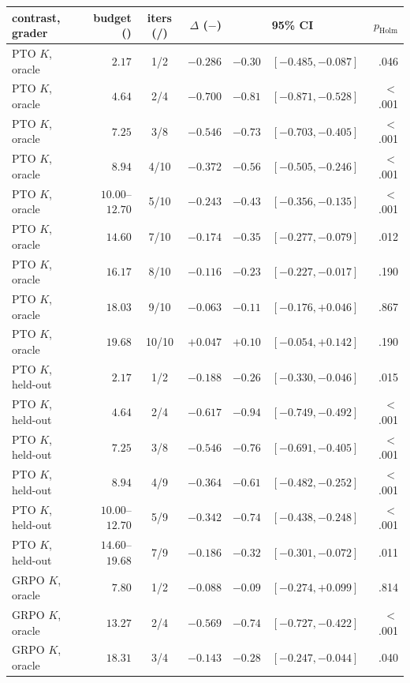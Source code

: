 \begin{table}[t]
  \centering\footnotesize
  \setlength{\tabcolsep}{4pt}
  \begin{tabular}{@{}l r c rrlr@{}}
    \toprule
    contrast, grader & budget (\gpuh{}) & iters (\Kf{}/\Kz{}) & $\Delta$ (\Kf{}$-$\Kz{}) & \dz{} & 95\% CI & $p_{\text{Holm}}$ \\
    \midrule
PTO $K$, oracle & $2.17$ & 1/2 & $-0.286$ & $-0.30$ & $[-0.485, -0.087]$ & .046 \\
PTO $K$, oracle & $4.64$ & 2/4 & $-0.700$ & $-0.81$ & $[-0.871, -0.528]$ & $<$.001 \\
PTO $K$, oracle & $7.25$ & 3/8 & $-0.546$ & $-0.73$ & $[-0.703, -0.405]$ & $<$.001 \\
PTO $K$, oracle & $8.94$ & 4/10 & $-0.372$ & $-0.56$ & $[-0.505, -0.246]$ & $<$.001 \\
PTO $K$, oracle & $10.00$--$12.70$ & 5/10 & $-0.243$ & $-0.43$ & $[-0.356, -0.135]$ & $<$.001 \\
PTO $K$, oracle & $14.60$ & 7/10 & $-0.174$ & $-0.35$ & $[-0.277, -0.079]$ & .012 \\
PTO $K$, oracle & $16.17$ & 8/10 & $-0.116$ & $-0.23$ & $[-0.227, -0.017]$ & .190 \\
PTO $K$, oracle & $18.03$ & 9/10 & $-0.063$ & $-0.11$ & $[-0.176, +0.046]$ & .867 \\
PTO $K$, oracle & $19.68$ & 10/10 & $+0.047$ & $+0.10$ & $[-0.054, +0.142]$ & .190 \\
\addlinespace[2pt]
PTO $K$, held-out & $2.17$ & 1/2 & $-0.188$ & $-0.26$ & $[-0.330, -0.046]$ & .015 \\
PTO $K$, held-out & $4.64$ & 2/4 & $-0.617$ & $-0.94$ & $[-0.749, -0.492]$ & $<$.001 \\
PTO $K$, held-out & $7.25$ & 3/8 & $-0.546$ & $-0.76$ & $[-0.691, -0.405]$ & $<$.001 \\
PTO $K$, held-out & $8.94$ & 4/9 & $-0.364$ & $-0.61$ & $[-0.482, -0.252]$ & $<$.001 \\
PTO $K$, held-out & $10.00$--$12.70$ & 5/9 & $-0.342$ & $-0.74$ & $[-0.438, -0.248]$ & $<$.001 \\
PTO $K$, held-out & $14.60$--$19.68$ & 7/9 & $-0.186$ & $-0.32$ & $[-0.301, -0.072]$ & .011 \\
\addlinespace[2pt]
GRPO $K$, oracle & $7.80$ & 1/2 & $-0.088$ & $-0.09$ & $[-0.274, +0.099]$ & .814 \\
GRPO $K$, oracle & $13.27$ & 2/4 & $-0.569$ & $-0.74$ & $[-0.727, -0.422]$ & $<$.001 \\
GRPO $K$, oracle & $18.31$ & 3/4 & $-0.143$ & $-0.28$ & $[-0.247, -0.044]$ & .040 \\

\end{tabular}
\end{table}
